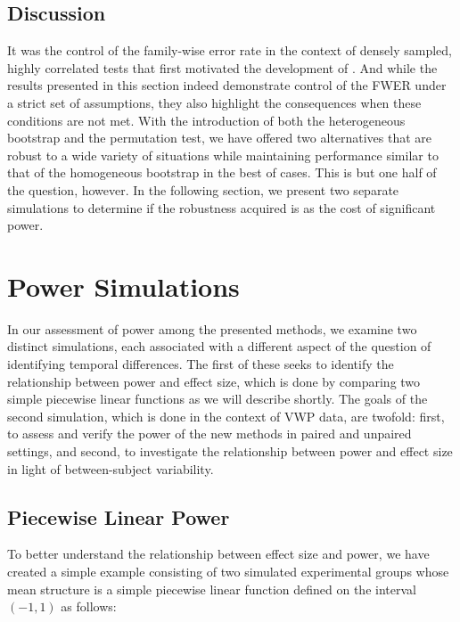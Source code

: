 \subsection{Discussion}


It was the control of the family-wise error rate in the context of densely sampled, highly correlated tests that first motivated the development of . And while the results presented in this section indeed demonstrate control of the FWER under a strict set of assumptions, they also highlight the consequences when these conditions are not met. With the introduction of both the heterogeneous bootstrap and the permutation test, we have offered two alternatives that are robust to a wide variety of situations while maintaining performance similar to that of the homogeneous bootstrap in the best of cases. This is but one half of the question, however. In the following section, we present two separate simulations to determine if the robustness acquired is as the cost of significant power.



\section{Power Simulations}

In our assessment of power among the presented methods, we examine two distinct simulations, each associated with a different aspect of the question of identifying temporal differences. The first of these seeks to identify the relationship between power and effect size, which is done by comparing two simple piecewise linear functions as we will describe shortly. The goals of the second simulation, which is done in the context of VWP data, are twofold: first, to assess and verify the power of the new methods in paired and unpaired settings, and second, to investigate the relationship between power and effect size in light of between-subject variability.

\subsection{Piecewise Linear Power}

To better understand the relationship between effect size and power, we have created a simple example consisting of two simulated experimental groups whose mean structure is a simple piecewise linear function defined on the interval $(-1, 1)$ as follows:


